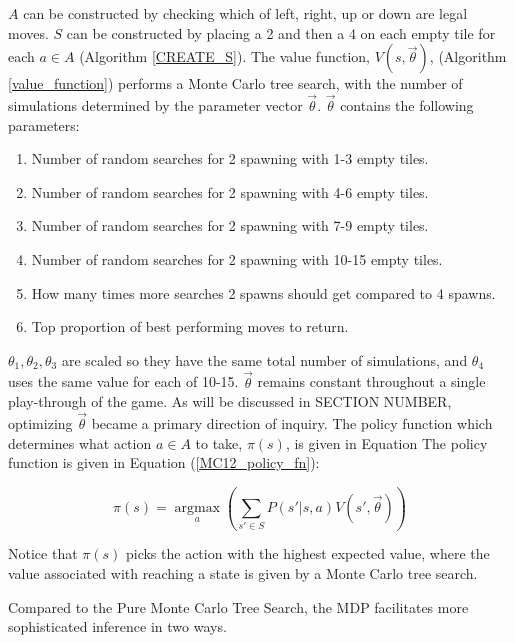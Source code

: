 \documentclass{article}
\DeclareMathOperator*{\argmax}{argmax}
\begin{document}
$A$ can be constructed by checking which of left, right, up or down are legal moves. $S$ can be constructed by placing a 2 and then a 4 on each empty tile for each $a \in A$ (Algorithm \ref{CREATE_S}). The value function, $V(s, \vec{\theta})$,  (Algorithm \ref{value_function}) performs a Monte Carlo tree search, with the number of simulations determined by the parameter vector $\vec{\theta}$.  $\vec{\theta}$ contains the following parameters:
\begin{enumerate}
	\item Number of random searches for 2 spawning with 1-3 empty tiles.
	\item Number of random searches for 2 spawning with 4-6 empty tiles.
	\item Number of random searches for 2 spawning with 7-9 empty tiles.
	\item Number of random searches for 2 spawning with 10-15 empty tiles.
	\item How many times more searches 2 spawns should get compared to 4 spawns.
	\item Top proportion of best performing moves to return.
\end{enumerate}

$\theta_1, \theta_2, \theta_3$ are scaled so they have the same total number of simulations, and $\theta_4$ uses the same value for each of 10-15.  $\vec{\theta}$ remains constant throughout a single play-through of the game.  As will be discussed in SECTION NUMBER, optimizing $\vec{\theta}$ became a primary direction of inquiry. The policy function which determines what action $a \in A$ to take, $\pi(s)$, is given in Equation The policy function is given in Equation (\ref{MC12_policy_fn}):

\begin{equation}
\label{MC12_policy_fn}
\pi(s) = \argmax\limits_{a}\left( \sum\limits_{s' \in S} P(s'|s, a)V(s', \vec{\theta}) \right)
\end{equation}


Notice that $\pi(s)$ picks the action with the highest expected value, where the value associated with reaching a state is given by a Monte Carlo tree search.


Compared to the Pure Monte Carlo Tree Search, the MDP facilitates more sophisticated inference in two ways. 
\end{document}
